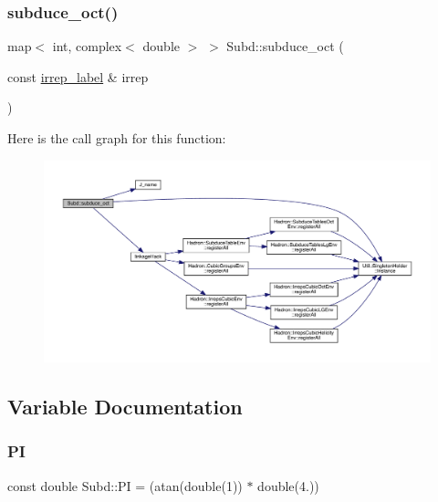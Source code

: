 \subsubsection{\texorpdfstring{subduce\_oct()}{subduce\_oct()}}
{\footnotesize\ttfamily map$<$ int, complex$<$ double $>$ $>$ Subd\+::subduce\+\_\+oct (\begin{DoxyParamCaption}\item[{const \mbox{\hyperlink{structirrep__label}{irrep\+\_\+label}} \&}]{irrep }\end{DoxyParamCaption})}

Here is the call graph for this function\+:
\nopagebreak
\begin{figure}[H]
\begin{center}
\leavevmode
\includegraphics[width=350pt]{d8/d2b/namespaceSubd_aa8b77162377de658856d44a4ac5aad26_cgraph}
\end{center}
\end{figure}


\subsection{Variable Documentation}
\mbox{\label{namespaceSubd_ace729813ef603fd0775fe11788d9ad07}} 
\subsubsection{\texorpdfstring{PI}{PI}}
{\footnotesize\ttfamily const double Subd\+::\+PI = (atan(double(1)) $\ast$ double(4.))}

